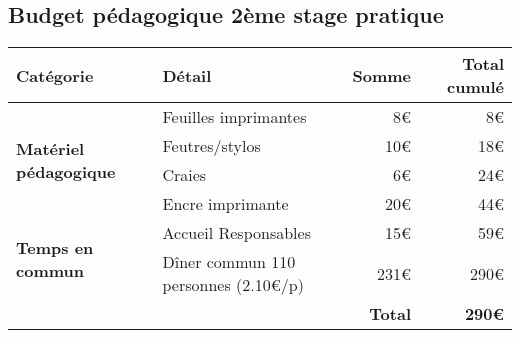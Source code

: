 \documentclass[titlepage,11pt,a4paper]{article}
\begin{document}
\subsection{Budget pédagogique 2ème stage pratique}

\begin{center}
   \begin{tabular}{|l|l|r|r|}
      \hline
      \textbf{Catégorie} & \textbf{Détail} & \textbf{Somme} & \textbf{Total cumulé} \\
      \hline
      \multirow{4}{10em}{\textbf{Matériel pédagogique}} & Feuilles imprimantes & 8€ & 8€ \\
      & Feutres/stylos & 10€ & 18€ \\
      & Craies & 6€ & 24€ \\
      & Encre imprimante & 20€ & 44€ \\
      \hline
      \multirow{2}{10em}{\textbf{Temps en commun}} & Accueil Responsables & 15€ & 59€ \\
      & Dîner commun 110 personnes (2.10€/p) & 231€ & 290€ \\
      \hline
      &  & \textbf{Total} & \textbf{290€} \\
      \hline
   \end{tabular}
\end{center}
\end{document}
